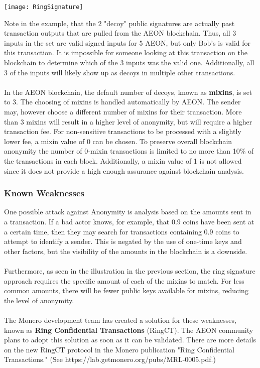 \begin{center}
	\texttt{[image: RingSignature]}
\end{center}
Note in the example, that the 2 "decoy" public signatures are actually past transaction outputs that are pulled from the AEON blockchain. Thus, all 3 inputs in the set are valid signed inputs for 5 AEON, but only Bob's is valid for this transaction.  It is impossible for someone looking at this transaction on the blockchain to determine which of the 3 inputs was the valid one.  Additionally, all 3 of the inputs will likely show up as decoys in multiple other transactions.\\
\\
In the AEON blockchain, the default number of decoys, known as \textbf{mixins}, is set to 3.  The choosing of mixins is handled automatically by AEON. The sender may, however choose a different number of mixins for their transaction.  More than 3 mixins will result in a higher level of anonymity, but will require a higher transaction fee.  For non-sensitive transactions to be processed with a slightly lower fee, a mixin value of 0 can be chosen.  To preserve overall blockchain anonymity the number of 0-mixin transactions is limited to no more than 10\% of the transactions in each block.  Additionally, a mixin value of 1 is not allowed since it does not provide a high enough assurance against blockchain analysis.

\subsubsection{Known Weaknesses}
One possible attack against Anonymity is analysis based on the amounts sent in a transaction. If a bad actor knows, for example, that 0.9 coins have been sent at a certain time, then they may search for transactions containing 0.9 coins to attempt to identify a sender.  This is negated by the use of one-time keys and other factors, but the visibility of the amounts in the blockchain is a downside.\\
\\
Furthermore, as seen in the illustration in the previous section, the ring signature approach requires the specific amount of each of the mixins to match.  For less common amounts, there will be fewer public keys available for mixins, reducing the level of anonymity.\\
\\
The Monero development team has created a solution for these weaknesses, known as \textbf{Ring Confidential Transactions} (RingCT).  The AEON community plans to adopt this solution as soon as it can be validated.  There are more details on the new RingCT protocol in the Monero publication "Ring Confidential Transactions." (See https://lab.getmonero.org/pubs/MRL-0005.pdf.)

